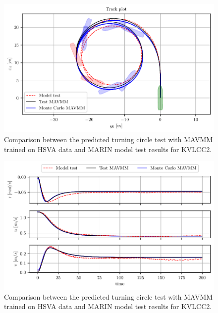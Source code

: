 \begin{figure}[h!]
\centering
\includegraphics[width=1.0\textwidth]{kappa/images/17.pdf}
\caption{Comparison between the predicted turning circle test with MAVMM trained on HSVA data and MARIN model test results for KVLCC2.}\label{\detokenize{06.20_results_kvlcc2:fig-kvlcc2-track-plot-testing-sim}}\end{figure}
\begin{figure}[h!]
\centering
\includegraphics[width=1.0\textwidth]{kappa/images/18.pdf}
\caption{Comparison between the predicted turning circle test with MAVMM trained on HSVA data and MARIN model test results for KVLCC2.}\label{\detokenize{06.20_results_kvlcc2:fig-kvlcc2-testing-sim}}\end{figure}
